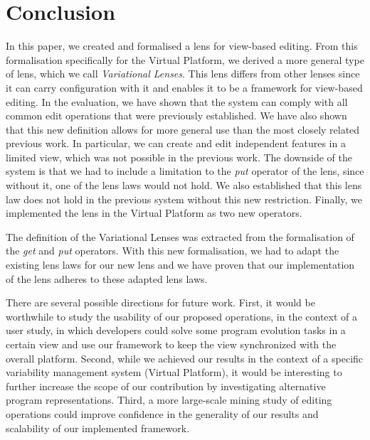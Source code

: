 \chapter{Conclusion}\label{sec:conclusion}
In this paper, we created and formalised a lens for view-based editing. From 
this formalisation
specifically for the Virtual Platform, we derived a more general type of lens,
which we call \emph{Variational Lenses}. This lens differs from other lenses
since it can carry configuration with it and enables it to be a framework for
view-based editing. In the evaluation, we have shown that the system
can comply with all common edit operations that were previously established. 
We have also shown that this new definition allows for more general use than 
the most closely related previous work.
In particular, we can create and edit
independent features in a limited view, which was not possible in the previous work. 
The downside of the system is that we had to include a limitation to the 
\emph{put} operator of the lens, since without it, one of the lens laws would
not hold. We also established that this lens law does not hold in the previous
system without this new restriction. Finally, we implemented the lens in the
Virtual Platform as two new operators.

The definition of the Variational Lenses was extracted from the formalisation
of the \emph{get} and \emph{put} operators. With this new formalisation, we had
to adapt the existing lens laws for our new lens and we have proven that our
implementation of the lens adheres to these adapted lens laws.

There are several possible directions for future work. First, it would be worthwhile
to study the usability of our proposed operations, in the context of a user study, 
in which developers could solve some program evolution tasks in a certain view and use 
our framework to keep the view synchronized with the overall platform. Second, while 
we achieved our results in the context of a specific variability management system 
(Virtual Platform), it would be interesting to further increase the scope of our 
contribution by investigating alternative program representations. Third, a more 
large-scale mining study of editing operations could improve confidence in the 
generality of our results and scalability of our implemented framework.
